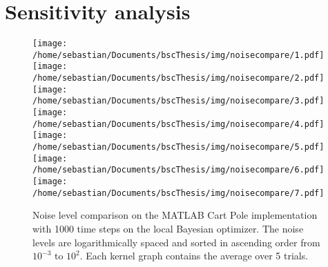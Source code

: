 \section{Sensitivity analysis}
\begin{figure}[H]
\centering
\texttt{[image: /home/sebastian/Documents/bscThesis/img/noisecompare/1.pdf]}
\texttt{[image: /home/sebastian/Documents/bscThesis/img/noisecompare/2.pdf]}
\texttt{[image: /home/sebastian/Documents/bscThesis/img/noisecompare/3.pdf]}
\texttt{[image: /home/sebastian/Documents/bscThesis/img/noisecompare/4.pdf]}
\texttt{[image: /home/sebastian/Documents/bscThesis/img/noisecompare/5.pdf]}
\texttt{[image: /home/sebastian/Documents/bscThesis/img/noisecompare/6.pdf]}
\texttt{[image: /home/sebastian/Documents/bscThesis/img/noisecompare/7.pdf]}
\caption{Noise level comparison on the MATLAB Cart Pole implementation with 1000 time steps on the local Bayesian optimizer. The noise levels are logarithmically spaced and sorted in ascending order from $10^{-3}$ to $10^2$. Each kernel graph contains the average over 5 trials.}
\label{fig:noisecompare}
\end{figure}
